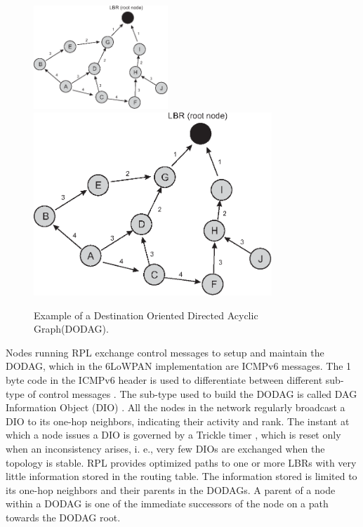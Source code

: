\documentclass[final,authoryear,3p,twocolumn]{elsarticle}
\begin{document}
\begin{figure}[h!tb]
\centering
\ifdefined\TWOCOL
\includegraphics[width=0.45\textwidth]{figures/RPL_DIO}
\else
\includegraphics[width=0.8\textwidth]{RPL_DIO}
\fi
\caption{Example of a Destination Oriented Directed Acyclic Graph(DODAG).}
\label{RPL_DIO}
\end{figure}

Nodes running RPL exchange control messages to setup and maintain the DODAG, which in the 6LoWPAN implementation are ICMPv6 messages. The 1 byte code in the ICMPv6 header is used to differentiate between different sub-type of control messages \citep{RFC4443}. The sub-type used to build the DODAG is called DAG Information Object (DIO) \citep{RFC6550}. All the nodes in the network regularly broadcast a DIO to its one-hop neighbors, indicating their activity and rank. The instant at which a node issues a DIO is governed by a Trickle timer \citep{trickle}, which is reset only when an inconsistency arises, i. e., very few DIOs are exchanged when the topology is stable. RPL provides optimized paths to one or more LBRs with very little information stored in the routing table. The information stored is limited to its one-hop neighbors and their parents in the DODAGs. A parent of a node within a DODAG is one of the immediate successors of the node on a path towards the DODAG root.
\end{document}
